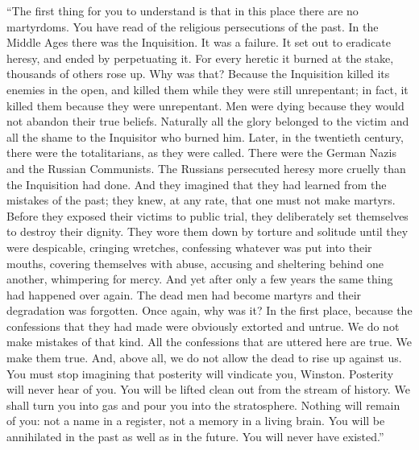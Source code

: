 \begin{paracol}{2}
``The first thing for you to understand is that in this place there are
no martyrdoms. You have read of the religious persecutions of the past.
In the Middle Ages there was the Inquisition. It was a failure. It set
out to eradicate heresy, and ended by perpetuating it. For every heretic
it burned at the stake, thousands of others rose up. Why was that?
Because the Inquisition killed its enemies in the open, and killed them
while they were still unrepentant; in fact, it killed them because they
were unrepentant. Men were dying because they would not abandon their
true beliefs. Naturally all the glory belonged to the victim and all the
shame to the Inquisitor who burned him. Later, in the twentieth century,
there were the totalitarians, as they were called. There were the German
Nazis and the Russian Communists. The Russians persecuted heresy more
cruelly than the Inquisition had done. And they imagined that they had
learned from the mistakes of the past; they knew, at any rate, that one
must not make martyrs. Before they exposed their victims to public
trial, they deliberately set themselves to destroy their dignity. They
wore them down by torture and solitude until they were despicable,
cringing wretches, confessing whatever was put into their mouths,
covering themselves with abuse, accusing and sheltering behind one
another, whimpering for mercy. And yet after only a few years the same
thing had happened over again. The dead men had become martyrs and their
degradation was forgotten. Once again, why was it? In the first place,
because the confessions that they had made were obviously extorted and
untrue. We do not make mistakes of that kind. All the confessions that
are uttered here are true. We make them true. And, above all, we do not
allow the dead to rise up against us. You must stop imagining that
posterity will vindicate you, Winston. Posterity will never hear of you.
You will be lifted clean out from the stream of history. We shall turn
you into gas and pour you into the stratosphere. Nothing will remain of
you: not a name in a register, not a memory in a living brain. You will
be annihilated in the past as well as in the future. You will never have
existed.''

\switchcolumn


\end{paracol}
